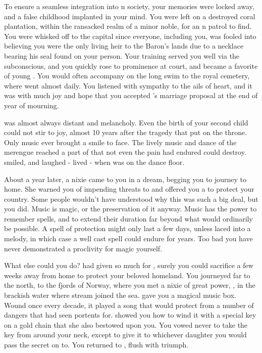 \documentclass[char]{NeptuneBall}
\begin{document}
To ensure a seamless integration into \pAtlantis{}n society, your memories were locked away, and a false childhood implanted in your mind. You were left on a destroyed coral plantation, within the ransacked realm of a minor noble, for an \pAtlantis{}n patrol to find. You were whisked off to the capital since everyone, including you, was fooled into believing you were the only living heir to the Baron's lands due to a necklace bearing his seal found on your person. Your training served you well via the subconscious, and you quickly rose to prominence at court, and became a favorite of young \cKing{\King} \cKing{}. You would often accompany \cKing{\them} on the long swim to the royal cemetery, where \cKing{\they} went almost daily. You listened with sympathy to the ails of \cKing{\their} heart, and it was with much joy and hope that you accepted \cKing{\King} \cKing{}'s marriage proposal at the end of \cKing{\their} year of mourning.

\cKing{\King} \cKing{} was almost always distant and melancholy. Even the birth of your second child could not stir \cKing{\them} to joy, almost 10 years after the tragedy that put \cKing{\them} on the throne. Only music ever brought a smile to \cKing{\their} face. The lively music and dance of the merengue reached a part of \cKing{\them} that not even the pain \cKing{\they} had endured could destroy. \cKing{\They} smiled, and laughed - \cKing{\They} lived - when \cKing{\they} was on the dance floor.

About a year later, a nixie came to you in a dream, begging you to journey to \cNixie{\them} home. She warned you of impending threats to \pAtlantis{} and offered you a \iMusicBox{\MYname} to protect your country. Some people wouldn't have understood why this was such a big deal, but you did. Music is magic, or the preservation of it anyway. Music has the power to remember spells, and to extend their duration far beyond what would ordinarily be possible. A spell of protection might only last a few days, unless laced into a melody, in which case a well cast spell could endure for years. Too bad you have never demonstrated a proclivity for magic yourself.

What else could you do? \cKing{} had given so much for \pAtlantis{}, surely you could sacrifice a few weeks away from home to protect your beloved homeland. You journeyed far to the north, to the fjords of Norway, where you met a nixie of great power, \cNixie{\MYname}, in the brackish water where \cNixie{\them} stream joined the sea. \cNixie{} gave you a magical music box. Wound once every decade, it played a song that would protect \pAtlantis{} from a number of dangers that \cNixie{} had seen portents for. \cNixie{\They} showed you how to wind it with a special key on a gold chain that she also bestowed upon you. You vowed never to take the key from around your neck, except to give it to whichever daughter you would pass the secret on to. You returned to \pAtlantis{}, flush with triumph.
\end{document}
